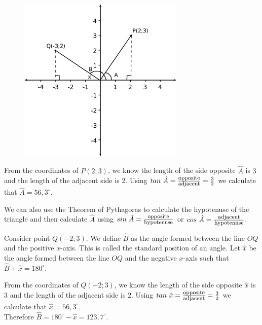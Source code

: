 \setcounter{subfigure}{0}
\begin{center}
\begin{figure}[H] %

\label{m39411*id63458!!!underscore!!!media}\label{m39411*id63458!!!underscore!!!printimage}\includegraphics[width=300px]{col11306.imgs/m39411_trigfunc1.png} %
\vspace{2pt}
\vspace{.1in}

\end{figure}  
\end{center}
From the coordinates of $P(2;3)$, we know the length of the side opposite $\hat{A}$ is $3$ and the length of the adjacent side is $2$. Using $tan~\hat{A}=\frac{\mbox{\footnotesize opposite}}{\mbox{\footnotesize adjacent}} = \frac{3}{2}$ we calculate that $\hat{A}=56,3^{\circ}$.\par

We can also use the Theorem of Pythagoras to calculate the hypotenuse of the triangle and then calculate $\hat{A}$ using $sin~\hat{A} = \frac{\mbox{\footnotesize opposite}}{\mbox{\footnotesize hypotenuse}}$ or $cos~\hat{A} = \frac{\mbox{\footnotesize adjacent}}{\mbox{\footnotesize hypotenuse}}$. \par
Consider point $Q(-2;3)$. We define $\hat{B}$ as the angle formed between the line $OQ$ and the positive $x$-axis. This is called the standard position of an angle. Let $\hat{x}$ be the angle formed between the line $OQ$ and the negative $x$-axis such that $\hat{B} + \hat{x} = 180^{\circ}$.
\par

From the coordinates of $Q(-2;3)$, we know the length of the side opposite $\hat{x}$ is $3$ and the length of the adjacent side is $2$. Using $tan~\hat{x}=\frac{\mbox{\footnotesize opposite}}{\mbox{\footnotesize adjacent}} = \frac{3}{2}$ we calculate that $\hat{x}=56,3^{\circ}$.
\\Therefore $\hat{B}=180^{\circ} - \hat{x} = 123,7^{\circ}$.\par


